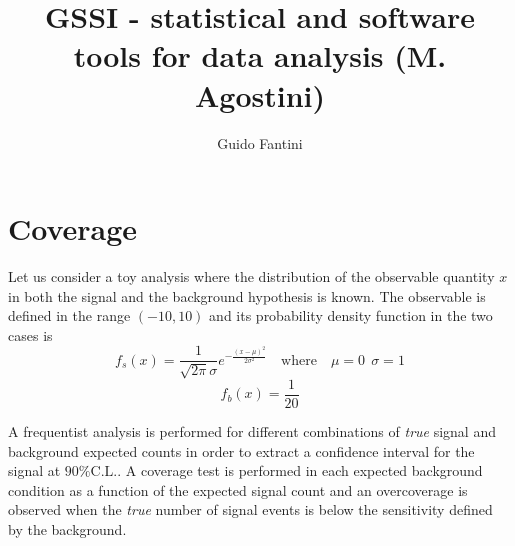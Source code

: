 \documentclass[10pt, oneside]{article}   	%
\title{GSSI - statistical and software tools for data analysis (M. Agostini)}
\author{Guido Fantini}
\date{}							%
\begin{document}
\maketitle


\newpage
\tableofcontents %

\newpage %

\section{Coverage}

Let us consider a toy analysis where the distribution of the observable quantity $x$ in both the signal and the background hypothesis is known.
The observable is defined in the range $(-10,10)$ and its probability density function in the two cases is
$$ f_s(x) = \frac{1}{\sqrt{2\pi} \sigma} e^{-\frac{(x-\mu)^2}{2\sigma^2}} \quad \mathrm{where} \quad \mu = 0 \:\: \sigma = 1 $$
$$ f_b(x) = \frac{1}{20} $$

A frequentist analysis is performed for different combinations of \textit{true} signal and background expected counts in order to extract a confidence interval for the signal at $90\% \mathrm{C.L.} $. A coverage test is performed in each expected background condition as a function of the expected signal count and an overcoverage is observed when the \textit{true} number of signal events is below the sensitivity defined by the background. 
\end{document}
